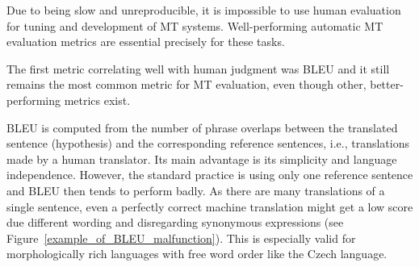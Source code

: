 \documentclass[11pt]{article}
\def\Fref#1{Figure~\ref{#1}}
\begin{document}
Due to being slow and unreproducible, it is impossible to use human evaluation
for tuning and development of MT systems. Well-performing automatic MT evaluation
metrics are essential precisely for these tasks.

The first metric correlating well with human judgment was BLEU \cite{bleu} and
it still remains the most common metric for MT evaluation, even though other,
better-performing metrics exist. \cite{wmt13-metrics} %

BLEU is computed from the number of phrase overlaps between the translated
sentence (hypothesis) and the corresponding reference sentences, i.e., translations
made by a human translator. Its main advantage is its simplicity and language independence. 
However, the standard practice is using only one reference sentence and BLEU then tends 
to perform badly. As there are many translations of 
a single sentence, even a perfectly correct machine translation might get a low score 
due different wording and disregarding synonymous expressions (see \Fref{example_of_BLEU_malfunction}). 
This is especially valid for morphologically rich languages with free word order like 
the Czech language. \cite{bojar-tackling-sparse-data}
\end{document}
